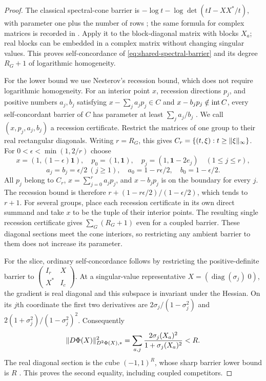 \begin{proof}
The classical spectral-cone barrier is
$-\log t-\log\det(tI-XX^*/t)$, with parameter one plus the number
of rows \citep[Section 4.2]{CKV2022natural}; the same formula for complex matrices
is recorded in \citet[Section 2.6.1]{Coey2022thesis}.
Apply it to the block-diagonal matrix with blocks $X_a$; real blocks
can be embedded in a complex matrix without changing singular values.
This proves self-concordance of \eqref{eq:shared-spectral-barrier} and
its degree $R_G+1$ of logarithmic homogeneity.

For the lower bound we use Nesterov's recession bound, which does not
require logarithmic homogeneity.  For an interior point $x$, recession directions $p_j$, and positive
numbers $a_j,b_j$ satisfying
$x-\sum_j a_jp_j\in C$ and $x-b_jp_j\notin\operatorname{int} C$, every
self-concordant barrier of $C$ has parameter at least $\sum_j a_j/b_j$
\citep[Theorem 3.9]{FS2023}.  We call $(x,p_j,a_j,b_j)$ a recession certificate.
Restrict the matrices of one group to their real rectangular diagonals.
Writing $r=R_G$, this gives $C_r=\{(t,\xi):t\geq\lVert \xi\rVert_\infty\}$.
For $0<\epsilon<\min(1,2/r)$ choose
\[
 x=(1,(1-\epsilon)\boldsymbol1),\quad
 p_0=(1,\boldsymbol1),\quad
 p_j=(1,\boldsymbol1-2e_j)\quad(1\leq j\leq r),
\]
\[
 a_j=b_j=\epsilon/2\ (j\geq1),\quad
 a_0=1-r\epsilon/2,\quad b_0=1-\epsilon/2.
\]
All $p_j$ belong to $C_r$, $x=\sum_{j=0}^r a_jp_j$, and
$x-b_jp_j$ is on the boundary for every $j$.
The recession bound is therefore
$r+(1-r\epsilon/2)/(1-\epsilon/2)$, which tends to $r+1$.
For several groups, place each recession certificate in its own direct summand
and take $x$ to be the tuple of their interior points.  The resulting
single recession certificate gives $\sum_G(R_G+1)$ even for a coupled barrier.
These diagonal sections meet the cone interiors, so restricting any
ambient barrier to them does not increase its parameter.

For the slice, ordinary self-concordance follows by restricting the
positive-definite barrier to
$\left(\begin{smallmatrix}I_r&X\\X^*&I_c\end{smallmatrix}\right)$.
At a singular-value representative $X=(\operatorname{diag}(\sigma_j)\;0)$,
the gradient is real diagonal and this subspace is invariant under the
Hessian.  On its $j$th coordinate the first two derivatives are
$2\sigma_j/(1-\sigma_j^2)$ and
$2(1+\sigma_j^2)/(1-\sigma_j^2)^2$.  Consequently
\[
 \lVert D\Phi(X)\rVert_{D^2\Phi(X),*}^2
       =\sum_{a,j}\frac{2\sigma_j(X_a)^2}{1+\sigma_j(X_a)^2}<R.
\]
The real diagonal section is the cube $(-1,1)^R$, whose sharp barrier
lower bound is $R$ \citep[Proposition 2.3.6]{NN1994}.
This proves the second equality, including coupled competitors.
\end{proof}

